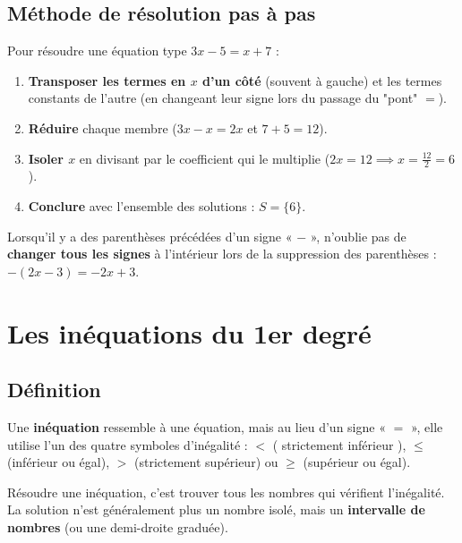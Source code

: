 \documentclass[../main.tex]{subfiles}
\begin{document}
\subsection{Méthode de résolution pas à pas}

\begin{methode}
Pour résoudre une équation type $3x - 5 = x + 7$ :
\begin{enumerate}
  \item \textbf{Transposer les termes en $x$ d'un côté} (souvent à gauche) et les termes constants de l'autre (en changeant leur signe lors du passage du "pont" $=$).
  \item \textbf{Réduire} chaque membre ($3x - x = 2x$ et $7 + 5 = 12$).
  \item \textbf{Isoler $x$} en divisant par le coefficient qui le multiplie ($2x = 12 \implies x = \frac{12}{2} = 6$).
  \item \textbf{Conclure} avec l'ensemble des solutions : $S = \{6\}$.
\end{enumerate}
\end{methode}

\begin{attention}
Lorsqu'il y a des parenthèses précédées d'un signe « $-$ », n'oublie pas de \textbf{changer tous les signes} à l'intérieur lors de la suppression des parenthèses : $-(2x - 3) = -2x + 3$.
\end{attention}

\section{Les inéquations du 1er degré}

\subsection{Définition}

Une \textbf{inéquation} ressemble à une équation, mais au lieu d'un signe « $=$ », elle utilise l'un des quatre symboles d'inégalité : $<$ ( strictement inférieur ), $\leq$ (inférieur ou égal), $>$ (strictement supérieur) ou $\geq$ (supérieur ou égal).

\begin{definition}
Résoudre une inéquation, c'est trouver tous les nombres qui vérifient l'inégalité. La solution n'est généralement plus un nombre isolé, mais un \textbf{intervalle de nombres} (ou une demi-droite graduée).
\end{definition}
\end{document}
